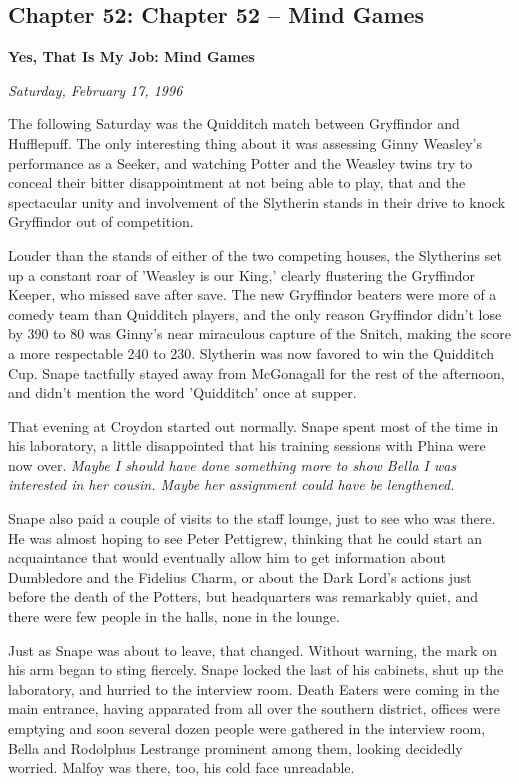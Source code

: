 \documentclass[a4paper,11pt]{article}
\begin{document}
\subsection{Chapter 52: Chapter 52 – Mind Games}

\textbf{Yes, That Is My Job: Mind Games}

\emph{Saturday, February 17, 1996}

The following Saturday was the Quidditch match between Gryffindor and Hufflepuff. The only interesting thing about it was assessing Ginny Weasley's performance as a Seeker, and watching Potter and the Weasley twins try to conceal their bitter disappointment at not being able to play, that and the spectacular unity and involvement of the Slytherin stands in their drive to knock Gryffindor out of competition.

Louder than the stands of either of the two competing houses, the Slytherins set up a constant roar of 'Weasley is our King,' clearly flustering the Gryffindor Keeper, who missed save after save. The new Gryffindor beaters were more of a comedy team than Quidditch players, and the only reason Gryffindor didn't lose by 390 to 80 was Ginny's near miraculous capture of the Snitch, making the score a more respectable 240 to 230. Slytherin was now favored to win the Quidditch Cup. Snape tactfully stayed away from McGonagall for the rest of the afternoon, and didn't mention the word 'Quidditch' once at supper.

That evening at Croydon started out normally. Snape spent most of the time in his laboratory, a little disappointed that his training sessions with Phina were now over. \emph{Maybe I should have done something more to show Bella I was interested in her cousin. Maybe her assignment could have be lengthened.}

Snape also paid a couple of visits to the staff lounge, just to see who was there. He was almost hoping to see Peter Pettigrew, thinking that he could start an acquaintance that would eventually allow him to get information about Dumbledore and the Fidelius Charm, or about the Dark Lord's actions just before the death of the Potters, but headquarters was remarkably quiet, and there were few people in the halls, none in the lounge.

Just as Snape was about to leave, that changed. Without warning, the mark on his arm began to sting fiercely. Snape locked the last of his cabinets, shut up the laboratory, and hurried to the interview room. Death Eaters were coming in the main entrance, having apparated from all over the southern district, offices were emptying and soon several dozen people were gathered in the interview room, Bella and Rodolphus Lestrange prominent among them, looking decidedly worried. Malfoy was there, too, his cold face unreadable.
\end{document}
